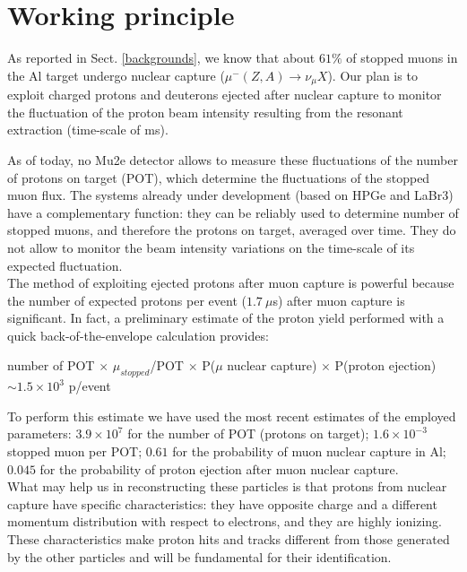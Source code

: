 \documentclass[12pt,a4paper,openright, oneside, titlepage]{book} %
\begin{document}
\section{Working principle}

\noindent
As reported in Sect. \ref{backgrounds}, we know that about $61\%$ of stopped muons in the Al target undergo nuclear capture ($\mu^-(Z,A)\rightarrow \nu_\mu X$). 
Our plan is to exploit charged protons and deuterons ejected after nuclear capture to monitor the fluctuation of the proton beam intensity resulting from the resonant extraction (time-scale of ms). 

\noindent 
As of today, no Mu2e detector allows to measure these fluctuations of the number of protons on target (POT), which determine the fluctuations of the stopped muon flux.
The systems already under development (based on HPGe and LaBr3) have a complementary function: they can be reliably used to determine number of stopped muons, and therefore the protons on target, averaged over time. 
They do not allow to monitor the beam intensity variations on the time-scale of its expected fluctuation.\\
The method of exploiting ejected protons after muon capture is powerful because the number of expected protons per event ($1.7\ \mu$s) after muon capture is significant. 
In fact, a preliminary estimate of the proton yield performed with a quick back-of-the-envelope calculation provides:

\begin{center}
\begin{footnotesize}
number of POT $\times$ $\mu_{stopped}$/POT $\times$ P($\mu$ nuclear capture) $\times$ P(proton ejection) $\sim 1.5\times10^3$ p/event
\end{footnotesize}
\end{center}
To perform this estimate we have used the most recent estimates of the employed parameters: 
$3.9\times10^7$ for the number of POT (protons on target); 
$1.6\times10^{-3}$ stopped muon per POT; 
$0.61$ for the probability of muon nuclear capture in Al; 
$0.045$ for the probability of proton ejection after muon nuclear capture.\\
What may help us in reconstructing these particles is that protons from nuclear capture
have specific characteristics: they have opposite charge 
and a different momentum distribution with respect to electrons,
and they are highly ionizing.
These characteristics make proton hits and tracks different 
from those generated by the other particles and will be fundamental for their identification.
\end{document}

